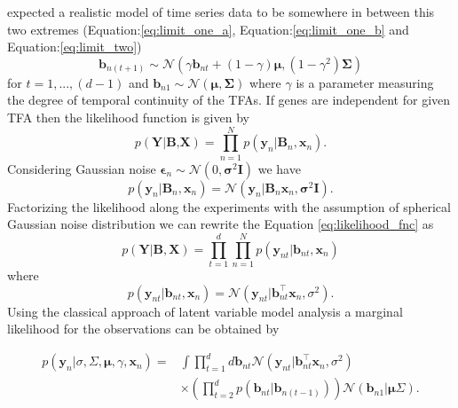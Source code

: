 \cite{Sanguinetti:2006}  expected a realistic model of time series data to be somewhere in between this two extremes (Equation:\ref{eq:limit_one_a}, Equation:\ref{eq:limit_one_b} and Equation:\ref{eq:limit_two})
\begin{equation} \label{eq:tfa_SanG_update}
  \textbf{b}_{n(t+1)} \sim \mathcal{N} (\gamma \textbf{b}_{nt} + (1-\gamma)\boldsymbol{\mu},(1-\gamma^2)\boldsymbol{\Sigma})
\end{equation}
for $ t= 1, ... , (d-1)$ and $ \textbf{b}_{n1} \sim \mathcal{N} ( \boldsymbol{\mu},\boldsymbol{\Sigma})$
where $\gamma$ is a parameter measuring the degree of temporal continuity of the TFAs. If genes are independent for given TFA then the likelihood function is given by
\begin{equation} \label{eq:likelihood_fnc}
  p\left(\textbf{Y}|\textbf{B,X}\right)= \prod_{n \mathop = 1}^{N} p\left(\textbf{y}_n|\textbf{B}_n,\textbf{x}_n\right).
\end{equation}
Considering Gaussian noise $\boldsymbol{\epsilon}_n \sim \mathcal{N} \left(0,\boldsymbol{\sigma}^2\textbf{I}\right)$ we have
\begin{equation} \label{eq:likelihood_fnc_SingleGene}
  p\left(\textbf{y}_n|\textbf{B}_n,\textbf{x}_n\right)= \mathcal{N} \left(\textbf{y}_n|\textbf{B}_n \textbf{x}_n, \boldsymbol{\sigma}^2\textbf{I} \right).
\end{equation}
Factorizing the likelihood along the experiments with the assumption of spherical Gaussian noise distribution we can rewrite the Equation \ref{eq:likelihood_fnc} as
\begin{equation} \label{eq:likelihood_factorize}
  p\left(\textbf{Y}|\textbf{B},\textbf{X}\right)= 
     \prod_{t \mathop = 1}^{d} \prod_{n \mathop = 1}^{N} p\left(\textbf{y}_{nt}|\textbf{b}_{nt},\textbf{x}_n\right)
\end{equation}
where
\begin{equation} \label{eq:likelihood_fnc_allGene}
  p\left(\textbf{y}_{nt}|\textbf{b}_{nt},\textbf{x}_n\right)= \mathcal{N} \left(\textbf{y}_{nt}|\textbf{b}^\top_{nt}\textbf{x}_n,\sigma^2 \right).
\end{equation}
Using the classical approach of latent variable model analysis a marginal likelihood for the observations can be obtained by

\begin{equation} \label{eq:marginal_likelihood_tfa}
\begin{aligned}
p\left(\textbf{y}_n|\sigma,\Sigma,\boldsymbol{\mu},\gamma,\textbf{x}_n\right) = &
\int \prod^{d}_{t=1} d\textbf{b}_{nt}\mathcal{N} \left(\textbf{y}_{nt}|\textbf{b}^\top_{nt}\textbf{x}_n, \sigma^2 \right)\\
& \times \left( \prod^{d}_{t=2} p\left(\textbf{b}_{nt}|\textbf{b}_{n(t-1)}\right) \right)
\mathcal{N} \left(\textbf{b}_{n1}|\boldsymbol{\mu}\Sigma \right).
\end{aligned}
\end{equation}

